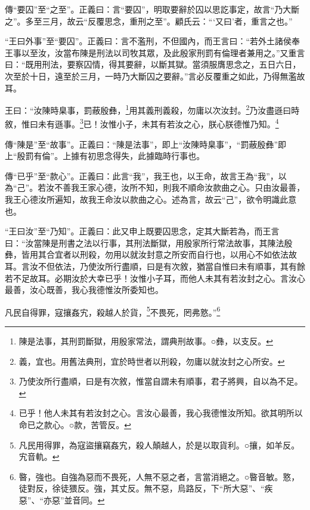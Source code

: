 {\noindent\zhuan{}\fzbyks 傳“要囚”至“之至”。正義曰：言“要囚”，明取要辭於囚以思訖事定，故言“乃大斷之”。多至三月，故云“反覆思念，重刑之至”。顧氏云：“‘又曰’者，重言之也。” \par}

{\noindent\shu{}\fzkt “王曰外事”至“要囚”。正義曰：言不濫刑，不但國內，而王言曰：“若外土諸侯奉王事以至汝，汝當布陳是刑法以司牧其眾，及此殷家刑罰有倫理者兼用之。”又重言曰：“既用刑法，要察囚情，得其要辭，以斷其獄。當須服膺思念之，五日六日，次至於十日，遠至於三月，一時乃大斷囚之要辭。”言必反覆重之如此，乃得無濫故耳。 \par}

王曰：“汝陳時臬事，罰蔽殷彝，\footnote{陳是法事，其刑罰斷獄，用殷家常法，謂典刑故事。○彝，以支反。}用其義刑義殺，勿庸以次汝封。\footnote{義，宜也。用舊法典刑，宜於時世者以刑殺，勿庸以就汝封之心所安。}乃汝盡遜曰時敘，惟曰未有遜事。\footnote{乃使汝所行盡順，曰是有次敘，惟當自謂未有順事，君子將興，自以為不足。}已！汝惟小子，未其有若汝之心，朕心朕德惟乃知。\footnote{已乎！他人未其有若汝封之心。言汝心最善，我心我德惟汝所知。欲其明所以命已之款心。○款，苦管反。}


{\noindent\zhuan{}\fzbyks 傳“陳是”至“故事”。正義曰：“陳是法事”，即上“汝陳時臬事”，“罰蔽殷彝”即上“殷罰有倫”。上據有初思念得失，此據臨時行事也。 \par}

{\noindent\zhuan{}\fzbyks 傳“已乎”至“款心”。正義曰：此言“我”，我王也，以王命，故言王為“我”，以為“己”。若汝不善我王家心德，汝所不知，則我不順命汝款曲之心。只由汝最善，我王心德汝所遍知，故我王命汝以款曲之心。述為言，故云“己”，欲令明識此意也。 \par}

{\noindent\shu{}\fzkt “王曰汝”至“乃知”。正義曰：此又申上既要囚思念，定其大斷若為，而王言曰：“汝當陳是刑書之法以行事，其刑法斷獄，用殷家所行常法故事，其陳法殷彝，皆用其合宜者以刑殺，勿用以就汝封意之所安而自行也，以用心不如依法故耳。言汝不但依法，乃使汝所行盡順，曰是有次敘，猶當自惟曰未有順事，其有餘若不足故耳。必期汝於大幸已乎！汝惟小子耳，而他人未其有若汝封之心。言汝心最善，汝心既善，我心我德惟汝所委知也。 \par}

凡民自得罪，寇攘姦宄，殺越人於貨，\footnote{凡民用得罪，為寇盜攘竊姦宄，殺人顛越人，於是以取貨利。○攘，如羊反。宄音軌。}不畏死，罔弗憝。”\footnote{暋，強也。自強為惡而不畏死，人無不惡之者，言當消絕之。○暋音敏。憝，徒對反，徐徒猥反。強，其丈反。無不惡，烏路反，下“所大惡”、“疾惡”、“亦惡”並音同。}


